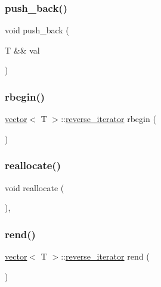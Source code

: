 \mbox{\label{classvector_a1b36a29ecdb3c4f319332698a216115e}} 
\subsubsection{\texorpdfstring{push\+\_\+back()}{push\_back()}\hspace{0.1cm}{\footnotesize\ttfamily [2/2]}}
{\footnotesize\ttfamily void push\+\_\+back (\begin{DoxyParamCaption}\item[{T \&\&}]{val }\end{DoxyParamCaption})}

\mbox{\label{classvector_ae35d513907ca2b5783ebebe7e6823ef4}} 
\subsubsection{\texorpdfstring{rbegin()}{rbegin()}}
{\footnotesize\ttfamily \mbox{\hyperlink{classvector}{vector}}$<$ T $>$\+::\mbox{\hyperlink{classvector_a92b881db836646f4039adcbb73c8595f}{reverse\+\_\+iterator}} rbegin (\begin{DoxyParamCaption}{ }\end{DoxyParamCaption})\hspace{0.3cm}{\ttfamily [noexcept]}}

\mbox{\label{classvector_aa5cad3f031015371cc0bf94aa6a2e5c5}} 
\subsubsection{\texorpdfstring{reallocate()}{reallocate()}}
{\footnotesize\ttfamily void reallocate (\begin{DoxyParamCaption}{ }\end{DoxyParamCaption})\hspace{0.3cm}{\ttfamily [inline]}, {\ttfamily [private]}}

\mbox{\label{classvector_ad92c79d29b7df0bb6e5daea24ac7f3f4}} 
\subsubsection{\texorpdfstring{rend()}{rend()}}
{\footnotesize\ttfamily \mbox{\hyperlink{classvector}{vector}}$<$ T $>$\+::\mbox{\hyperlink{classvector_a92b881db836646f4039adcbb73c8595f}{reverse\+\_\+iterator}} rend (\begin{DoxyParamCaption}{ }\end{DoxyParamCaption})\hspace{0.3cm}{\ttfamily [noexcept]}}

